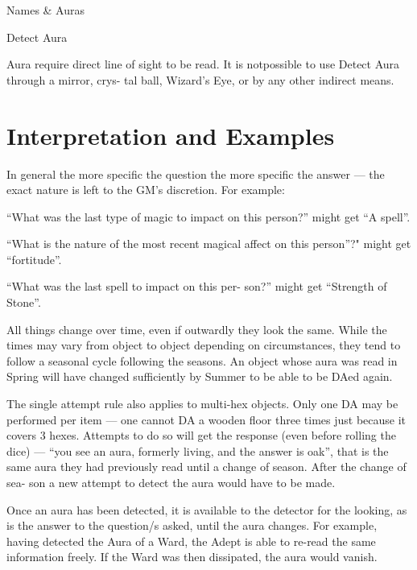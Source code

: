 \begin{Chapter}{Names \& Auras}
\begin{talent}{Detect Aura}
\begin{effects}
Aura require direct line of sight to be read. It is notpossible to use
Detect Aura through a mirror, crys- tal ball, Wizard’s Eye, or by any
other indirect means.
\end{effects}
\end{talent}

\section{Interpretation and Examples}

\begin{Enumerate}
\item In general the more specific the question the more specific the
  answer — the exact nature is left to the GM’s discretion. For
  example:
  \begin{Itemize}
  \item “What was the last type of magic to impact on this person?”
    might get “A spell”.

  \item “What is the nature of the most recent magical affect on this
    person”?" might get “fortitude”.

  \item “What was the last spell to impact on this per- son?” might
    get “Strength of Stone”.
  \end{Itemize}

\item All things change over time, even if outwardly they look the
  same. While the times may vary from object to object depending on
  circumstances, they tend to follow a seasonal cycle following the
  seasons.  An object whose aura was read in Spring will have changed
  sufficiently by Summer to be able to be DAed again.

\item The single attempt rule also applies to multi-hex objects.  Only
  one DA may be performed per item — one cannot DA a wooden floor
  three times just because it covers 3 hexes.  Attempts to do so will
  get the response (even before rolling the dice) — “you see an aura,
  formerly living, and the answer is oak”, that is the same aura they
  had previously read until a change of season.  After the change of
  sea- son a new attempt to detect the aura would have to be made.

\item Once an aura has been detected, it is available to the detector
  for the looking, as is the answer to the question/s asked, until the
  aura changes. For example, having detected the Aura of a Ward, the
  Adept is able to re-read the same information freely. If the Ward
  was then dissipated, the aura would vanish.


\end{Enumerate}
\end{Chapter}
